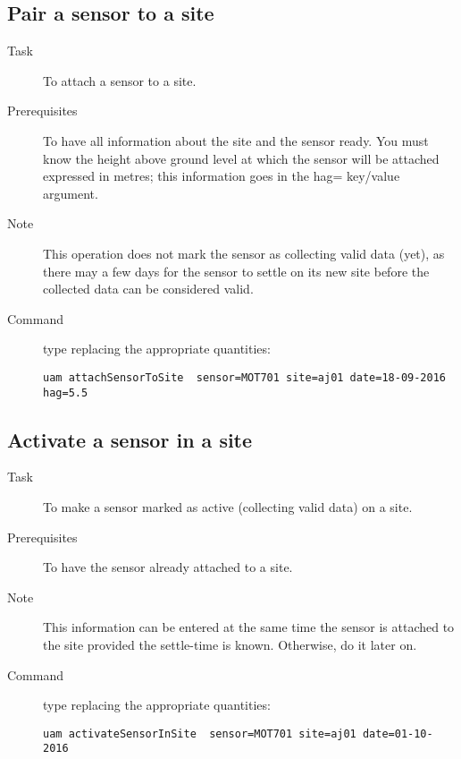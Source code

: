 \documentclass[12pt]{amsart}
\begin{document}
\subsection{Pair a sensor to a site}
\begin{description}
\item[Task] To attach a sensor to a site.

\item[Prerequisites] To have all information about the site and the sensor ready. You must know the height above ground level at which the sensor will be attached expressed in metres; this information goes in the hag= key/value argument.

\item[Note] This operation does not mark the sensor as collecting valid data (yet), as there may a few days for the sensor to settle on its new site before the collected data can be considered valid.

\item[Command] type replacing the appropriate quantities:

\begin{verbatim}
uam attachSensorToSite  sensor=MOT701 site=aj01 date=18-09-2016 hag=5.5
\end{verbatim}

\end{description}




\subsection{Activate a sensor in a site}
\begin{description}
\item[Task] To make a sensor marked as active (collecting valid data) on a site.

\item[Prerequisites] To have the sensor already attached to a site.

\item[Note] This information can be entered at the same time the sensor is attached to the site provided the settle-time is known. Otherwise, do it later on.



 
\item[Command] type replacing the appropriate quantities:

\begin{verbatim}
uam activateSensorInSite  sensor=MOT701 site=aj01 date=01-10-2016
\end{verbatim}

\end{description}
\end{document}
